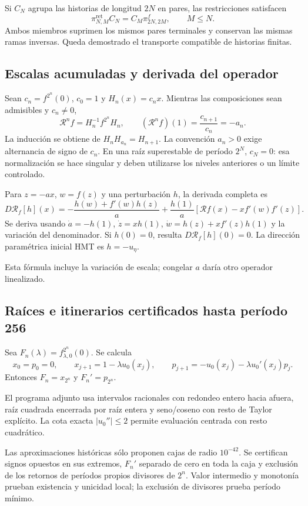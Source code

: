 Si \(C_N\) agrupa las historias de longitud \(2N\) en pares, las restricciones satisfacen
\[
\pi^{\mathrm{ret}}_{N,M}C_N
=C_M\pi^f_{2N,2M},\qquad M\le N.
\]
Ambos miembros suprimen los mismos pares terminales y conservan las mismas ramas inversas. Queda demostrado el transporte compatible de historias finitas.


\subsection{Escalas acumuladas y derivada del operador}
\label{hmtfg:desarrollo:6}

Sean \(c_n=f^{2^n}(0)\), \(c_0=1\) y \(H_n(x)=c_nx\). Mientras las composiciones sean admisibles y \(c_n\ne0\),
\[
\boxed{\mathcal R^nf=H_n^{-1}f^{2^n}H_n},\qquad
(\mathcal R^nf)(1)=\frac{c_{n+1}}{c_n}=-a_n.
\]
La inducción se obtiene de \(H_nH_{a_n}=H_{n+1}\). La convención \(a_n>0\) exige alternancia de signo de \(c_n\). En una raíz superestable de período \(2^N\), \(c_N=0\): esa normalización se hace singular y deben utilizarse los niveles anteriores o un límite controlado.

Para \(z=-ax\), \(w=f(z)\) y una perturbación \(h\), la derivada completa es
\[
\boxed{
D\mathcal R_f[h](x)=
-\frac{h(w)+f'(w)h(z)}a+
\frac{h(1)}a
\left[\mathcal Rf(x)-xf'(w)f'(z)\right].
}
\]
Se deriva usando \(\dot a=-h(1)\), \(\dot z=xh(1)\),
\(\dot w=h(z)+xf'(z)h(1)\) y la variación del denominador. Si \(h(0)=0\), resulta \(D\mathcal R_f[h](0)=0\). La dirección paramétrica inicial HMT es \(h=-u_\eta\).

Esta fórmula incluye la variación de escala; congelar \(a\) daría otro operador linealizado.


\subsection{Raíces e itinerarios certificados hasta período 256}
\label{hmtfg:desarrollo:7}

Sea \(F_n(\lambda)=f_{\lambda,0}^{2^n}(0)\). Se calcula
\[
x_0=p_0=0,\qquad x_{j+1}=1-\lambda u_0(x_j),\qquad
p_{j+1}=-u_0(x_j)-\lambda u_0'(x_j)p_j.
\]
Entonces \(F_n=x_{2^n}\) y \(F_n'=p_{2^n}\).

El programa adjunto usa intervalos racionales con redondeo entero hacia afuera, raíz cuadrada encerrada por raíz entera y seno/coseno con resto de Taylor explícito. La cota exacta \(|u_0''|\le2\) permite evaluación centrada con resto cuadrático.

Las aproximaciones históricas sólo proponen cajas de radio \(10^{-42}\). Se certifican signos opuestos en sus extremos, \(F_n'\) separado de cero en toda la caja y exclusión de los retornos de períodos propios divisores de \(2^n\). Valor intermedio y monotonía prueban existencia y unicidad local; la exclusión de divisores prueba período mínimo.

